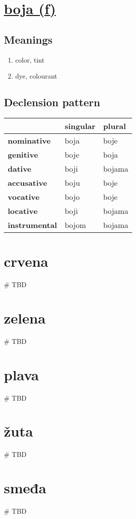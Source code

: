 \filbreak
\section{\underline{boja (f)}}
\subsection*{Meanings}
\begin{enumerate}
\item color, tint
\item dye, colourant
\end{enumerate}
\subsection*{Declension pattern}
\begin{tabularx}{\linewidth}{Xll}
\toprule
{} & singular &  plural \\
\midrule
\textbf{nominative  } &     boja &    boje \\
\textbf{genitive    } &     boje &    boja \\
\textbf{dative      } &     boji &  bojama \\
\textbf{accusative  } &     boju &    boje \\
\textbf{vocative    } &     bojo &    boje \\
\textbf{locative    } &     boji &  bojama \\
\textbf{instrumental} &    bojom &  bojama \\
\bottomrule
\end{tabularx}

\filbreak
\filbreak
\section{crvena}
{\# TBD}
\filbreak
\section{zelena}
{\# TBD}
\section{plava}
{\# TBD}
\section{žuta}
{\# TBD}
\section{smeđa}
{\# TBD}
